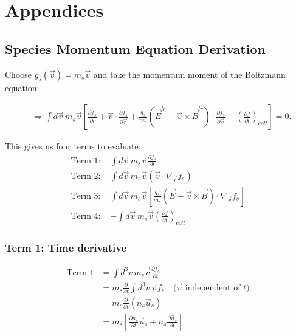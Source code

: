 \chapter{Appendices}

\section{Species Momentum Equation Derivation}
\label{sec:Species Momentum Equation}

Choose $g_s(\vec{v}) = m_s \vec{v}$ and take the momentum moment of the Boltzmann equation:

\begin{align*}
&\Rightarrow \int d\vec{v} \, m_s \vec{v} \left[\frac{\partial f_s}{\partial t}+ \vec{v} \cdot \frac{\partial f_s}{\partial \vec{r}} + \frac{q_s}{m_s}(\vec{E}^{lr} + \vec{v} \times \vec{B}^{lr}) \cdot \frac{\partial f_s}{\partial \vec{v}} - \left(\frac{\partial f}{\partial t}\right)_{coll}\right] = 0.
\end{align*}

This gives us four terms to evaluate:
\begin{align*}
\text{Term 1: } & \int d\vec{v} \, m_s \vec{v} \frac{\partial f_s}{\partial t} \\
\text{Term 2: } & \int d\vec{v} \, m_s \vec{v} (\vec{v} \cdot \nabla_{\vec{r}} f_s) \\
\text{Term 3: } & \int d\vec{v} \, m_s \vec{v} \left[\frac{q_s}{m_s}(\vec{E} + \vec{v} \times \vec{B}) \cdot \nabla_{\vec{v}} f_s\right] \\
\text{Term 4: } & -\int d\vec{v} \, m_s \vec{v} \left(\frac{\partial f}{\partial t}\right)_{coll}
\end{align*}

\subsection*{Term 1: Time derivative}

\begin{align*}
\text{Term 1} &= \int d^3v \, m_s \vec{v} \frac{\partial f_s}{\partial t}  \\
&= m_s \frac{\partial}{\partial t} \int d^3v \, \vec{v} f_s \quad \text{($\vec{v}$ independent of $t$)}  \\
&= m_s \frac{\partial}{\partial t} (n_s \vec{u}_s)  \\
&= m_s \left[ \frac{\partial n_s}{\partial t} \vec{u}_s + n_s \frac{\partial \vec{u}_s}{\partial t} \right]
\end{align*}


